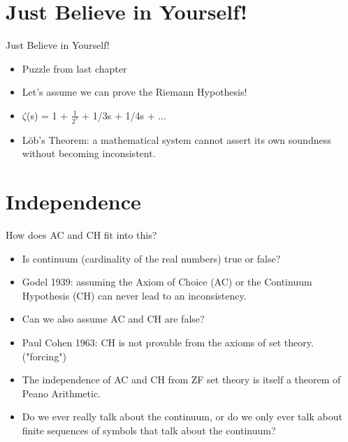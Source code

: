 \documentclass[
    11pt, %
    aspectratio=169, %
]{beamer}
\begin{document}
\section{Just Believe in Yourself!}

\begin{frame}{Just Believe in Yourself!}
\begin{itemize}
    \item Puzzle from last chapter
    \item Let's assume we can prove the Riemann Hypothesis!
    \item $\zeta$(s) = 1 + $\frac{1}{2^s}$ + 1/3s + 1/4s + ...
    \item Löb's Theorem: a mathematical system cannot assert its own soundness without becoming inconsistent. 
\end{itemize}   
\end{frame}


\section{Independence}

\begin{frame}{How does AC and CH fit into this?}
\begin{itemize}
    \item Is continuum (cardinality of the real numbers) true or false?
    \item Godel 1939: assuming the Axiom of Choice (AC) or the Continuum Hypothesis (CH) can never lead to an inconsistency.
    \item Can we also assume AC and CH are false?
    \item Paul Cohen 1963: CH is not provable from the axioms of set theory. ("forcing")
    \item The independence of AC and CH from ZF set theory is itself a theorem of Peano Arithmetic.
    \item Do we ever really talk about the continuum, or do we only ever talk about finite sequences of symbols that talk about the continuum?
\end{itemize}
    
\end{frame}
\end{document}
